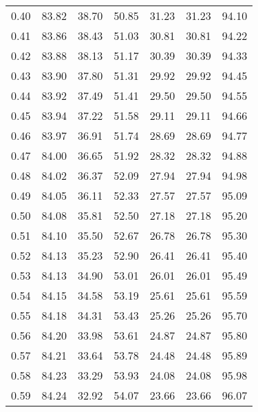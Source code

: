 \begin{tabular}{|c|c|c|c|c|c|c|}
      0.40 &     83.82 &     38.70 &      50.85 &   31.23 &      31.23 &         94.10 \\
      0.41 &     83.86 &     38.43 &      51.03 &   30.81 &      30.81 &         94.22 \\
      0.42 &     83.88 &     38.13 &      51.17 &   30.39 &      30.39 &         94.33 \\
      0.43 &     83.90 &     37.80 &      51.31 &   29.92 &      29.92 &         94.45 \\
      0.44 &     83.92 &     37.49 &      51.41 &   29.50 &      29.50 &         94.55 \\
      0.45 &     83.94 &     37.22 &      51.58 &   29.11 &      29.11 &         94.66 \\
      0.46 &     83.97 &     36.91 &      51.74 &   28.69 &      28.69 &         94.77 \\
      0.47 &     84.00 &     36.65 &      51.92 &   28.32 &      28.32 &         94.88 \\
      0.48 &     84.02 &     36.37 &      52.09 &   27.94 &      27.94 &         94.98 \\
      0.49 &     84.05 &     36.11 &      52.33 &   27.57 &      27.57 &         95.09 \\
      0.50 &     84.08 &     35.81 &      52.50 &   27.18 &      27.18 &         95.20 \\
      0.51 &     84.10 &     35.50 &      52.67 &   26.78 &      26.78 &         95.30 \\
      0.52 &     84.13 &     35.23 &      52.90 &   26.41 &      26.41 &         95.40 \\
      0.53 &     84.13 &     34.90 &      53.01 &   26.01 &      26.01 &         95.49 \\
      0.54 &     84.15 &     34.58 &      53.19 &   25.61 &      25.61 &         95.59 \\
      0.55 &     84.18 &     34.31 &      53.43 &   25.26 &      25.26 &         95.70 \\
      0.56 &     84.20 &     33.98 &      53.61 &   24.87 &      24.87 &         95.80 \\
      0.57 &     84.21 &     33.64 &      53.78 &   24.48 &      24.48 &         95.89 \\
      0.58 &     84.23 &     33.29 &      53.93 &   24.08 &      24.08 &         95.98 \\
      0.59 &     84.24 &     32.92 &      54.07 &   23.66 &      23.66 &         96.07 \\

\end{tabular}
